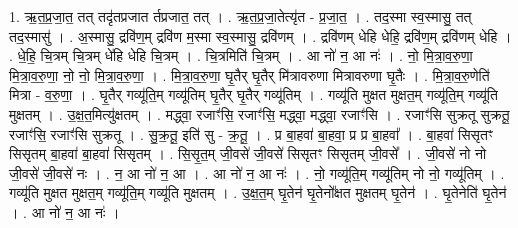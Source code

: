 \documentclass[17pt]{extarticle}
\begin{document}
1. ऋ॒त॒प्र॒जा॒त॒ तत् तदृ॑तप्रजात र्तप्रजात॒ तत् । . ऋ॒त॒प्र॒जा॒तेत्यृ॑त - प्र॒जा॒त॒ । . तद॒स्मा स्व॒स्मासु॒ तत् तद॒स्मासु॑ । . अ॒स्मासु॒ द्रवि॑ण॒म् द्रवि॑ण म॒स्मा स्व॒स्मासु॒ द्रवि॑णम् । . द्रवि॑णम् धेहि धेहि॒ द्रवि॑ण॒म् द्रवि॑णम् धेहि । . धे॒हि॒ चि॒त्रम् चि॒त्रम् धे॑हि धेहि चि॒त्रम् । . चि॒त्रमिति॑ चि॒त्रम् । . आ नो॑ न॒ आ नः॑ । . नो॒ मि॒त्रा॒व॒रु॒णा॒ मि॒त्रा॒व॒रु॒णा॒ नो॒ नो॒ मि॒त्रा॒व॒रु॒णा॒ । . मि॒त्रा॒व॒रु॒णा॒ घृ॒तैर् घृ॒तैर् मि॑त्रावरुणा मित्रावरुणा घृ॒तैः । . मि॒त्रा॒व॒रु॒णेति॑ मित्रा - व॒रु॒णा॒ । . घृ॒तैर् गव्यू॑ति॒म् गव्यू॑तिम् घृ॒तैर् घृ॒तैर् गव्यू॑तिम् । . गव्यू॑ति मुक्षत मुक्षत॒म् गव्यू॑ति॒म् गव्यू॑ति मुक्षतम् । . उ॒क्ष॒त॒मित्यु॑क्षतम् । . मद्ध्वा॒ रजाꣳ॑सि॒ रजाꣳ॑सि॒ मद्ध्वा॒ मद्ध्वा॒ रजाꣳ॑सि । . रजाꣳ॑सि सुक्रतू सुक्रतू॒ रजाꣳ॑सि॒ रजाꣳ॑सि सुक्रतू । . सु॒क्र॒तू॒ इति॑ सु - क्र॒तू॒ । . प्र बा॒हवा॑ बा॒हवा॒ प्र प्र बा॒हवा᳚ । . बा॒हवा॑ सिसृतꣳ सिसृतम् बा॒हवा॑ बा॒हवा॑ सिसृतम् । . सि॒सृ॒त॒म् जी॒वसे॑ जी॒वसे॑ सिसृतꣳ सिसृतम् जी॒वसे᳚ । . जी॒वसे॑ नो नो जी॒वसे॑ जी॒वसे॑ नः । . न॒ आ नो॑ न॒ आ । . आ नो॑ न॒ आ नः॑ । . नो॒ गव्यू॑ति॒म् गव्यू॑तिम् नो नो॒ गव्यू॑तिम् । . गव्यू॑ति मुक्षत मुक्षत॒म् गव्यू॑ति॒म् गव्यू॑ति मुक्षतम् । . उ॒क्ष॒त॒म् घृ॒तेन॑ घृ॒तेनो᳚क्षत मुक्षतम् घृ॒तेन॑ । . घृ॒तेनेति॑ घृ॒तेन॑ । . आ नो॑ न॒ आ नः॑ । \newline
\end{document}
